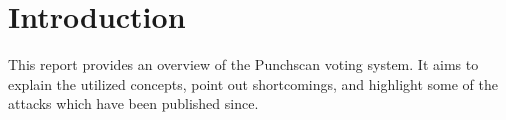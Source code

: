 \chapter{Introduction}
\label{chapter:introduction}

This report provides an overview of the Punchscan voting system. It aims to
explain the utilized concepts, point out shortcomings, and highlight some of
the attacks which have been published since.

